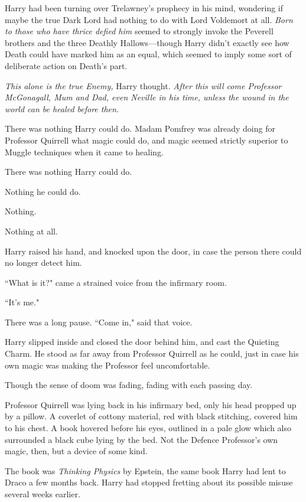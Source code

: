Harry had been turning over Trelawney's prophecy in his mind, wondering if maybe the true Dark Lord had nothing to do with Lord Voldemort at all. \emph{Born to those who have thrice defied him} seemed to strongly invoke the Peverell brothers and the three Deathly Hallows—though Harry didn't exactly see how Death could have marked him as an equal, which seemed to imply some sort of deliberate action on Death's part.

\emph{This alone is the true Enemy,} Harry thought. \emph{After this will come Professor McGonagall, Mum and Dad, even Neville in his time, unless the wound in the world can be healed before then.}

There was nothing Harry could do. Madam Pomfrey was already doing for Professor Quirrell what magic could do, and magic seemed strictly superior to Muggle techniques when it came to healing.

There was nothing Harry could do.

Nothing he could do.

Nothing.

Nothing at all.

\later

Harry raised his hand, and knocked upon the door, in case the person there could no longer detect him.

``What is it?" came a strained voice from the infirmary room.

``It's me."

There was a long pause. ``Come in," said that voice.

Harry slipped inside and closed the door behind him, and cast the Quieting Charm. He stood as far away from Professor Quirrell as he could, just in case his own magic was making the Professor feel uncomfortable.

Though the sense of doom was fading, fading with each passing day.

Professor Quirrell was lying back in his infirmary bed, only his head propped up by a pillow. A coverlet of cottony material, red with black stitching, covered him to his chest. A book hovered before his eyes, outlined in a pale glow which also surrounded a black cube lying by the bed. Not the Defence Professor's own magic, then, but a device of some kind.

The book was \emph{Thinking Physics} by Epstein, the same book Harry had lent to Draco a few months back. Harry had stopped fretting about its possible misuse several weeks earlier.

